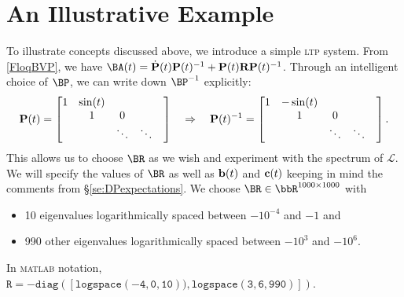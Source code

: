 \documentclass[pdflatex,sn-mathphys-num]{sn-jnl}%
\theoremstyle{thmstyleone}%
\theoremstyle{thmstyletwo}%
\theoremstyle{thmstylethree}%
\newcommand{\Ra}{\Rightarrow}
\def\Bb{{\bf b}}  \def\BB{{\bf B}}
\def\Bc{{\bf c}}  \def\BC{{\bf C}}
\def\Lop{\mathscr{L}}
\begin{document}
 
\section{An Illustrative Example}
\label{se:numex}
To illustrate concepts discussed above, we introduce a simple \textsc{ltp} system. 
From \eqref{FloqBVP}, we have $\BA(t) = \dot{\mathbf{P}}(t)\mathbf{P}(t)^{-1}+\mathbf{P}(t)\mathbf{R}\mathbf{P}(t)^{-1}$. Through an intelligent choice of $\BP$, we can write down $\BP^{-1}$ explicitly:  
\begin{equation}
\centering
\label{eq:exP}
\mathbf{P}(t)=\begin{bmatrix}
    1 & \sin(t) & & \\
     & 1 & 0  & &\\
     & & \ddots & \ddots &
\end{bmatrix}\quad \Ra \quad 
\mathbf{P}(t)^{-1}=\begin{bmatrix}
    1 & -\sin(t) & & \\
     & 1 & 0  & &\\
     & & \ddots & \ddots &
\end{bmatrix}.
\end{equation}
This allows us to choose $\BR$ as we wish and experiment with the spectrum of $\Lop$. We will specify the values of $\BR$ as well as $\Bb(t)$ and $\Bc(t)$ keeping in mind the comments from \S\ref{se:DPexpectations}. We choose $\BR\in\bbR^{1000\times1000}$ with 
\begin{itemize}
    \item 10 eigenvalues logarithmically spaced between $-10^{-4}$ and $-1$ and
    \item 990 other eigenvalues logarithmically spaced between $-10^3$ and $-10^6$.
\end{itemize}
In \textsc{matlab} notation, $\mathtt{ R = -diag([logspace(-4,0,10)), logspace(3,6,990)])}$.\\
\end{document}

